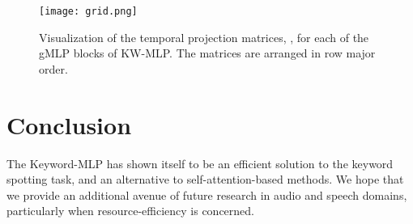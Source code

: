 \documentclass{article} \usepackage{iclr2022_conference,times}
\begin{document}
\begin{figure}[h]
\centering
    \texttt{[image: grid.png]}
\caption{Visualization of the temporal projection matrices, , for each of the  gMLP blocks of KW-MLP. The matrices are arranged in row major order.}
\label{fig:temp-matrix}
\end{figure}

\section{Conclusion}
The Keyword-MLP has shown itself to be an efficient solution to the keyword spotting task, and an alternative to self-attention-based methods. We hope that we provide an additional avenue of future research in audio and speech domains, particularly when resource-efficiency is concerned.





\end{document}
